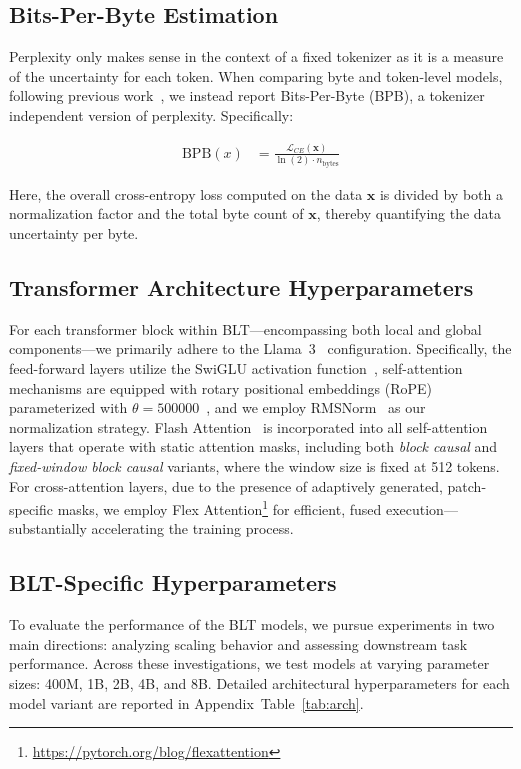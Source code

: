 \subsection{Bits-Per-Byte Estimation} Perplexity only makes sense in the context of a fixed tokenizer as it is a measure of the uncertainty for each token. When comparing byte and token-level models, following previous work~\citep{xue2022byt5, yu2023megabyte, wang2024mambabyte}, we instead report Bits-Per-Byte (BPB), a tokenizer independent version of perplexity. Specifically:

\begin{align}
    \text{BPB}(x)&= \frac{\mathcal{L}_{CE}(\pmb{x})}{\ln(2)\cdot n_{\text{bytes}}}
\end{align}

Here, the overall cross-entropy loss computed on the data $\pmb{x}$ is divided by both a normalization factor and the total byte count of $\pmb{x}$, thereby quantifying the data uncertainty per byte.

\subsection{Transformer Architecture Hyperparameters} For each transformer block within {\textsc BLT}—encompassing both local and global components—we primarily adhere to the Llama~3~\citep{dubey2024llama} configuration. Specifically, the feed-forward layers utilize the SwiGLU activation function~\citep{swiglu}, self-attention mechanisms are equipped with rotary positional embeddings (RoPE)~\citep{RoPe} parameterized with $\theta=500000$~\citep{xiong2024effective}, and we employ RMSNorm~\citep{RMSNorm} as our normalization strategy. Flash Attention~\citep{dao2022flashattention} is incorporated into all self-attention layers that operate with static attention masks, including both \textit{block causal} and \textit{fixed-window block causal} variants, where the window size is fixed at 512 tokens. For cross-attention layers, due to the presence of adaptively generated, patch-specific masks, we employ Flex Attention\footnote{\url{https://pytorch.org/blog/flexattention}} for efficient, fused execution—substantially accelerating the training process.

\subsection{{\textsc BLT}-Specific Hyperparameters} 

To evaluate the performance of the {\textsc BLT} models, we pursue experiments in two main directions: analyzing scaling behavior and assessing downstream task performance. Across these investigations, we test models at varying parameter sizes: 400M, 1B, 2B, 4B, and 8B. Detailed architectural hyperparameters for each model variant are reported in Appendix~Table~\ref{tab:arch}.

